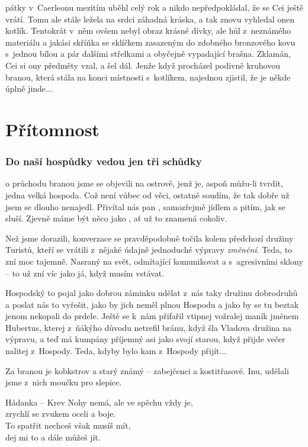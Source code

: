 \documentclass[a4paper,twocolumn,openany,nodeprecatedcode, justified]{dndbook}
\begin{document}
	pátky v~Caerleonu mezitím uběhl celý rok a nikdo nepředpokládal, že se Cei ještě vrátí. Tomu ale stále ležela na srdci záhadná kráska, a tak znovu vyhledal onen kotlík. Tentokrát v~něm ovšem nebyl obraz krásné dívky, ale hůl z~neznámého materiálu a jakási skříňka se sklíčkem zasazeným do zdobného bronzového kovu s~jednou bílou a pár dalšími střelkami a obyčejně vypadající brašna. Zklamán, Cei si ony předměty vzal, a šel dál. Jenže když procházel podivně kruhovou branou, která stála na konci místnosti s~kotlíkem, najednou zjistil, že je někde úplně jinde...
	
	
	\part{Přítomnost}
	\section[Sezení 1]{Do naší hospůdky vedou jen tři schůdky}
	o průchodu branou jsme se objevili na ostrově, jenž je, aspoň můžu-li tvrdit, jedna velká hospoda. Což není vůbec od věci, ostatně soudím, že tak dobře už jsem se dlouho nenajedl. Přivítal nás pan , samozřejmě jídlem a pitím, jak se sluší. Zjevně máme být něco jako , ať už to znamená cokoliv.
	
	Než jsme dorazili, konverzace se pravděpodobně točila kolem předchozí družiny Turistů, kteří se vrátili z~nějaké údajně jednoduché výpravy \emph{změnění}. Teda, to zní moc tajemně. Nasraný na svět, odmítající komunikovat a s~agresivními sklony -- to už zní víc jako já, když musím vstávat.
	
	Hospodský to pojal jako dobrou záminku udělat z~nás taky družinu dobrodruhů a poslat nás to vyřešit, jako by jich neměl plnou Hospodu a jako by se tu beztak jenom nekopali do prdele. Ještě se k~nám přifařil vtipnej vožralej maník jménem Hubertus, kterej z~ňákýho důvodu netrefil bránu, když šla Vladova družina na výpravu, a teď má kumpány příjemný asi jako svojí starou, když přijde večer nalitej z~Hospody. Teda, kdyby bylo kam z~Hospody přijít...
	
	Za branou je kobkstrov a starý známý -- zabejčenci a kostitřasové. Inu, udělali jsme z~nich moučku pro slepice.
	
	\begin{DndComment}{Hádanka -- Krev}
		\sffamily
		Nohy nemá, ale ve spěchu vždy je,\\
		zrychlí se zvukem oceli a boje.\\
		To spatřit nechceš však musíš mít,\\
		dej mi to a dále můžeš jít.
	\end{DndComment}
	
\end{document}
